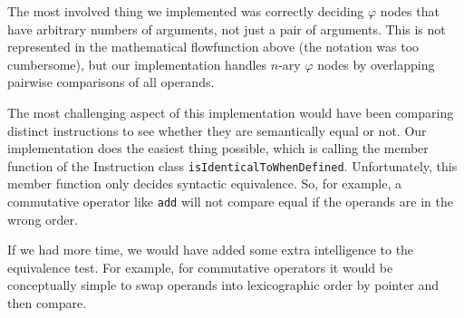 \documentclass{article}
\theoremstyle{definition}
\begin{document}
The most involved thing we implemented was correctly deciding
$\varphi$ nodes that have arbitrary numbers of arguments, not just a
pair of arguments. This is not represented in the mathematical
flowfunction above (the notation was too cumbersome), but our
implementation handles $n$-ary $\varphi$ nodes by overlapping pairwise
comparisons of all operands. 

The most challenging aspect of this implementation would have been
comparing distinct instructions to see whether they are semantically
equal or not. Our implementation does the easiest thing possible,
which is calling the member function of the Instruction class
\texttt{isIdenticalToWhenDefined}. Unfortunately, this member function
only decides syntactic equivalence. So, for example, a commutative
operator like \texttt{add} will not compare equal if the operands are
in the wrong order.

If we had more time, we would have added some extra intelligence to
the equivalence test. For example, for commutative operators it would
be conceptually simple to swap operands into lexicographic order by
pointer and then compare.
\end{document}
